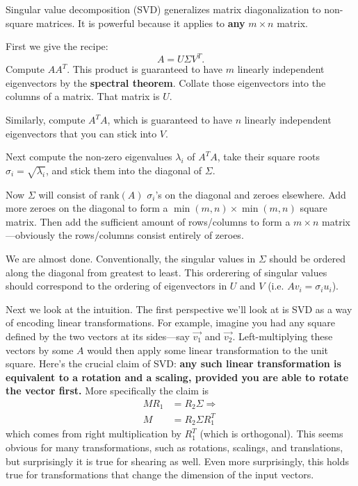 \documentclass{article}
\begin{document}
Singular value decomposition (SVD) generalizes matrix diagonalization to non-square matrices. 
It is powerful because it applies to \textbf{any} $m \times n$ matrix.

First we give the recipe: 
\begin{equation} 
    A = U \Sigma V^T. \label{eq:SVD} \tag{SVD}
\end{equation}
Compute $AA^T$. This product is guaranteed to have $m$ linearly independent eigenvectors by the 
\textbf{spectral theorem}. Collate those eigenvectors into the columns of a matrix. That matrix is $U$. 

Similarly, compute $A^TA$, which is guaranteed to have $n$ linearly independent eigenvectors 
that you can stick into $V$.

Next compute the non-zero eigenvalues $\lambda_i$ of $A^TA$, take their square roots 
$\sigma_i = \sqrt{\lambda_i}$, and stick them into the diagonal of $\Sigma$. 

Now $\Sigma$ will consist of $\text{rank}(A)$ $\sigma_i$'s on the diagonal and zeroes elsewhere.
Add more zeroes on the diagonal to form a $\min(m, n) \times \min(m, n)$ square matrix. Then add the sufficient
amount of rows/columns to form a $m \times n$ matrix---obviously the rows/columns consist 
entirely of zeroes.

We are almost done. Conventionally, the singular values in $\Sigma$ should be ordered along the diagonal
from greatest to least. This orderering of singular values should correspond to the ordering of 
eigenvectors in $U$ and $V$ (i.e. $Av_i = \sigma_iu_i$).

Next we look at the intuition. The first perspective we'll look at is SVD as a way of encoding linear transformations.
For example, imagine you had any square defined by the two vectors at its sides---say $\vec{v_1}$
and $\vec{v_2}$. Left-multiplying these vectors by some $A$ would then apply some linear transformation
to the unit square. Here's the crucial claim of SVD: \textbf{any such linear transformation is equivalent
to a rotation and a scaling, provided you are able to rotate the vector first.} More specifically the 
claim is 
\begin{align}
MR_1 &= R_2\Sigma \Rightarrow \nonumber \\
M &= R_2 \Sigma R_1^T \nonumber
\end{align}
which comes from right multiplication by $R_1^T$ (which is orthogonal). This seems obvious for many
transformations, such as rotations, scalings, and translations, but surprisingly it
is true for shearing as well. Even more surprisingly, this holds true for transformations that change
the dimension of the input vectors.
\end{document}
